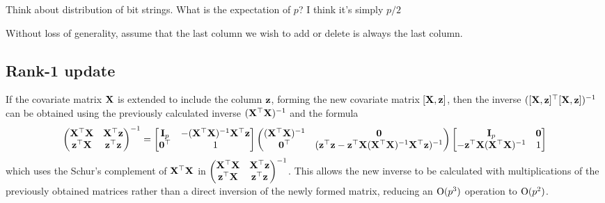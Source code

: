\documentclass{amsart}[12pt]
\newcommand{\mgc}[1]{{\color{blue}#1}}
\begin{document}
\mgc{Think about distribution of bit strings. What is the expectation of $p$? I think it's simply $p/2$}

Without loss of generality, assume that the last column we wish to add or delete is always the last column.
\subsection{Rank-1 update}

If the covariate matrix ${\bf X}$ is extended to include the column ${\bf z}$, forming the new covariate matrix $[{\bf X},
{\bf z}]$, then the inverse $([{\bf X}, {\bf z}]^\top [{\bf X}, {\bf z}])^{-1}$ can be obtained using the previously calculated
inverse $({\bf X}^\top {\bf X})^{-1}$ and the formula
\begin{equation}
\label{eq:blockinverse}
	\begin{pmatrix}
		{\bf X}^\top {\bf X} & {\bf X}^\top {\bf z} \\
		{\bf z}^\top {\bf X} & {\bf z}^\top {\bf z}
	\end{pmatrix}^{-1}
	=
	\begin{bmatrix}
		{\bf I}_p & -({\bf X}^\top {\bf X})^{-1} {\bf X}^\top {\bf z} \\
		{\bf 0}^\top & 1
	\end{bmatrix}
	\begin{pmatrix}
		({\bf X}^\top {\bf X})^{-1} & {\bf 0} \\
		{\bf 0}^\top & ({\bf z}^\top{\bf z} - {\bf z}^\top {\bf X}({\bf X}^\top {\bf X})^{-1} {\bf X}^\top {\bf z})^{-1}
	\end{pmatrix}
	\begin{bmatrix}
		{\bf I}_p & {\bf 0} \\
		-{\bf z}^\top {\bf X} ({\bf X}^\top {\bf X})^{-1} & 1
	\end{bmatrix}
\end{equation}
which uses the Schur's complement of ${\bf X}^\top {\bf X}$ in
$\begin{pmatrix}
	{\bf X}^\top {\bf X} & {\bf X}^\top {\bf z} \\
	{\bf z}^\top {\bf X} & {\bf z}^\top {\bf z}
\end{pmatrix}^{-1}$. This allows the new inverse to be calculated with multiplications of the previously obtained
matrices rather than a direct inversion of the newly formed matrix, reducing an $\text{O}(p^3)$ operation to
$\text{O}(p^2)$.
\end{document}
